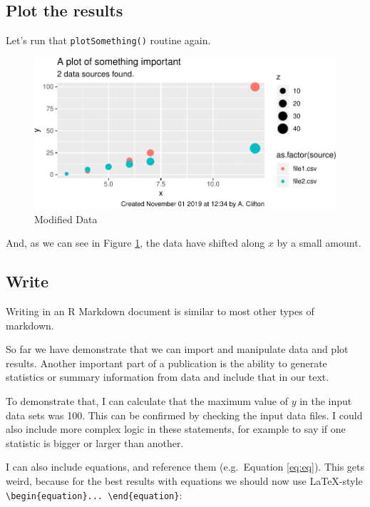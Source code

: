 \documentclass[11pt,]{article}
\begin{document}
\hypertarget{plot-the-results}{%
\subsection{Plot the results}\label{plot-the-results}}

Let's run that \texttt{plotSomething()} routine again.

\begin{figure}
\centering
\includegraphics{main_files/figure-latex/plot-modified-data-1.pdf}
\caption{\label{fig:plot-modified-data}Modified Data}
\end{figure}

And, as we can see in Figure \ref{fig:plot-modified-data}, the data have shifted along \(x\) by a small amount.

\hypertarget{implementWrite}{%
\subsection{Write}\label{implementWrite}}

Writing in an R Markdown document is similar to most other types of markdown.

So far we have demonstrate that we can import and manipulate data and plot results. Another important part of a publication is the ability to generate statistics or summary information from data and include that in our text.

To demonstrate that, I can calculate that the maximum value of \(y\) in the input data sets was 100. This can be confirmed by checking the input data files. I could also include more complex logic in these statements, for example to say if one statistic is bigger or larger than another.

I can also include equations, and reference them (e.g.~Equation \eqref{eq:eq}). This gets weird, because for the best results with equations we should now use LaTeX-style \texttt{\textbackslash{}begin\{equation\}...\ \textbackslash{}end\{equation\}}:
\end{document}
